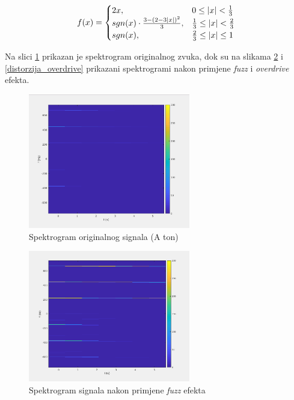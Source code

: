 \documentclass[conference]{IEEEtran}
\begin{document}
\begin{equation}
  f(x)=
    \begin{cases}
      2\*x, & 0 \leq |x|<\frac{1}{3} \\
      sgn(x)\cdot\frac{3-(2-3\*|x|)^2}{3}, & \frac{1}{3} \leq |x| < \frac{2}{3} \\
      sgn(x), & \frac{2}{3} \leq |x| \leq 1 \\
    \end{cases}
  \label{overdrive}
\end{equation}

Na slici \ref{A_original_spektar} prikazan je spektrogram originalnog zvuka, dok su na slikama
\ref{distorzija_fuzz} i \ref{distorzija_overdrive} prikazani spektrogrami nakon primjene \textit{fuzz} i
\textit{overdrive} efekta.

\begin{figure}[H]
    \includegraphics[width=200pt]{slike/A_ton.png}
    \centering
    \caption{Spektrogram originalnog signala (A ton)}
    \label{A_original_spektar}
\end{figure}

\begin{figure}[H]
    \includegraphics[width=200pt]{slike/distorzija_fuzz.png}
    \centering
    \caption{Spektrogram signala nakon primjene \textit{fuzz} efekta}
    \label{distorzija_fuzz}
\end{figure}
\end{document}
